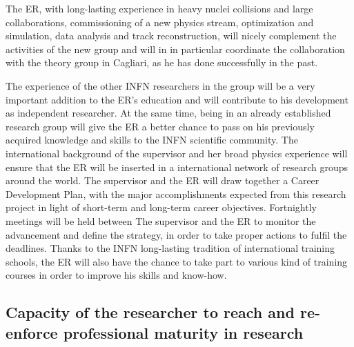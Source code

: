 \documentclass[a4paper,11pt]{article}
\newcommand{\ER}{ER\xspace}
\newcommand{\supervisor}{the supervisor\xspace}
\newcommand{\Supervisor}{The supervisor\xspace}
\begin{document}
The \ER, with long-lasting experience in heavy nuclei
collisions and large collaborations, commissioning
of a new physics stream, optimization and simulation, data analysis and track
reconstruction, will nicely complement the activities
of the new group and will in
in particular coordinate the 
collaboration with the 
theory group in Cagliari, as he has 
done successfully in the past.


The experience of the other INFN 
researchers in the group will be a very important addition to the \ER's
education and will contribute to his development as independent
researcher. At the same time, being in an already established research
group will give the \ER a better chance to pass on his previously
acquired knowledge and skills to the INFN scientific community. 
The international background of \supervisor and her 
broad physics experience will ensure that the 
\ER will be inserted in a international network of 
research groups around the world.  
\Supervisor and the \ER will draw together a Career Development Plan,
with the major accomplishments expected from this research project in
light of short-term and long-term career objectives. Fortnightly
meetings will be held between \Supervisor and the \ER to monitor the
advancement and define the strategy, in order to take proper actions
to fulfil the deadlines. Thanks to the INFN long-lasting tradition of
international training schools, the \ER will also have the chance to take
part to various kind of training courses in order to improve his
skills and know-how.  

%              
            

\subsection{Capacity of the researcher to reach and re-enforce professional maturity in research}
\label{sec:maturity}
\end{document}

